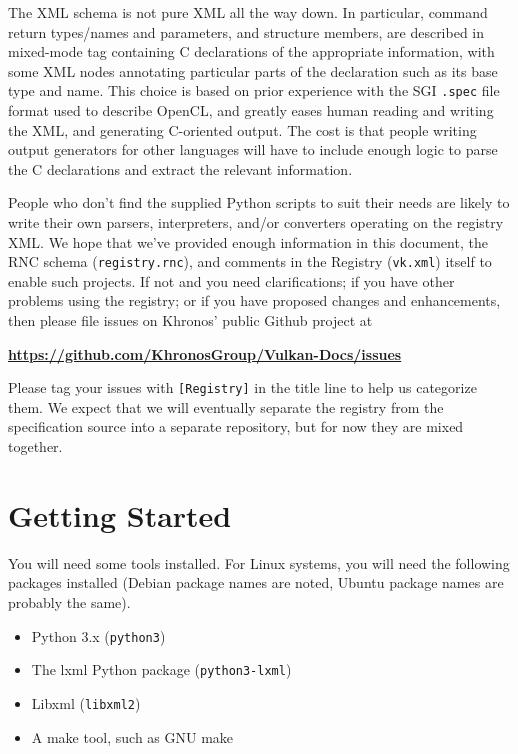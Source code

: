 \documentclass{article}
\def\code#1{{\tt #1}}
\begin{document}
The XML schema is not pure XML all the way down. In particular, command
return types/names and parameters, and structure members, are described in
mixed-mode tag containing C declarations of the appropriate information,
with some XML nodes annotating particular parts of the declaration such as
its base type and name. This choice is based on prior experience with the
SGI {\tt .spec} file format used to describe OpenCL, and greatly eases human
reading and writing the XML, and generating C-oriented output. The cost is
that people writing output generators for other languages will have to
include enough logic to parse the C declarations and extract the relevant
information.

People who don't find the supplied Python scripts to suit their needs are
likely to write their own parsers, interpreters, and/or converters operating
on the registry XML. We hope that we've provided enough information in this
document, the RNC schema ({\tt registry.rnc}), and comments in the Registry
({\tt vk.xml}) itself to enable such projects. If not and you need
clarifications; if you have other problems using the registry; or if you
have proposed changes and enhancements, then please file issues on Khronos'
public Github project at

\begin{center}
{\bf \href{https://github.com/KhronosGroup/Vulkan-Docs/issues}
          {https://github.com/KhronosGroup/Vulkan-Docs/issues}}
\end{center}

Please tag your issues with {\tt [Registry]} in the title line to help us
categorize them. We expect that we will eventually separate the registry
from the specification source into a separate repository, but for now they
are mixed together.


\section{Getting Started}
\label{starting}

You will need some tools installed.
For Linux systems, you will need the following packages installed (Debian
package names are noted, Ubuntu package names are probably the same).

\begin{itemize}
\item Python 3.x (\code{python3})
\item The lxml Python package (\code{python3-lxml})
\item Libxml (\code{libxml2})
\item A make tool, such as GNU make
\end{itemize}
\end{document}
